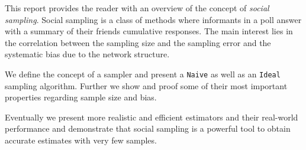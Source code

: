 This report provides the reader with an overview of the concept of \textit{social sampling}.
Social sampling is a class of methods where informants in a poll answer with a summary of their friends cumulative responses. The main interest lies in the correlation between the sampling size and the sampling error and the systematic bias due to the network structure.

We define the concept of a sampler and present a \texttt{Naive} as well as an \texttt{Ideal} sampling algorithm. Further we show and proof some of their most important properties regarding sample size and bias.

Eventually we present more realistic and efficient estimators and their real-world performance and demonstrate that social sampling is a powerful tool to obtain accurate estimates with very few samples.

